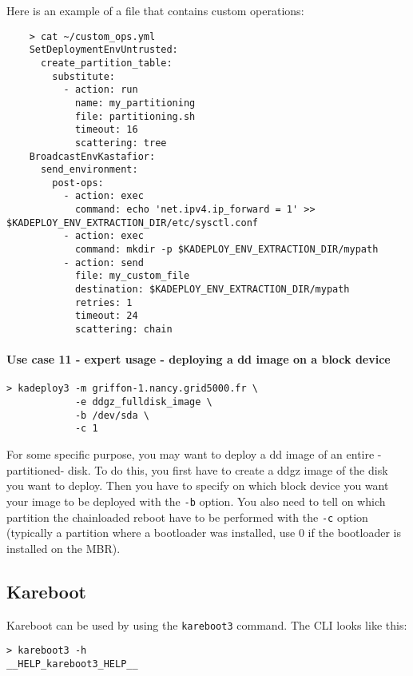 \documentclass[a4wide,10pt,oneside]{book}
\begin{document}
Here is an example of a file that contains custom operations:
\begin{small}
\begin{verbatim}
    > cat ~/custom_ops.yml
    SetDeploymentEnvUntrusted:
      create_partition_table:
        substitute:
          - action: run
            name: my_partitioning
            file: partitioning.sh
            timeout: 16
            scattering: tree
    BroadcastEnvKastafior:
      send_environment:
        post-ops:
          - action: exec
            command: echo 'net.ipv4.ip_forward = 1' >> $KADEPLOY_ENV_EXTRACTION_DIR/etc/sysctl.conf
          - action: exec
            command: mkdir -p $KADEPLOY_ENV_EXTRACTION_DIR/mypath
          - action: send
            file: my_custom_file
            destination: $KADEPLOY_ENV_EXTRACTION_DIR/mypath
            retries: 1
            timeout: 24
            scattering: chain
\end{verbatim}
\end{small}

\paragraph{Use case 11 - expert usage - deploying a dd image on a block device}
\begin{verbatim}
> kadeploy3 -m griffon-1.nancy.grid5000.fr \
            -e ddgz_fulldisk_image \
            -b /dev/sda \
            -c 1
\end{verbatim}

For some specific purpose, you may want to deploy a dd image of an entire -partitioned- disk. To do this, you first have to create a ddgz image of the disk you want to deploy. Then you have to specify on which block device you want your image to be deployed with the \texttt{-b} option. You also need to tell on which partition the chainloaded reboot have to be performed with the \texttt{-c} option (typically a partition where a bootloader was installed, use 0 if the bootloader is installed on the MBR).

\subsection{Kareboot}
Kareboot can be used by using the \texttt{kareboot3} command. The CLI looks like this:
\begin{small}
\begin{verbatim}
> kareboot3 -h
__HELP_kareboot3_HELP__
\end{verbatim}
\end{small}
\end{document}
